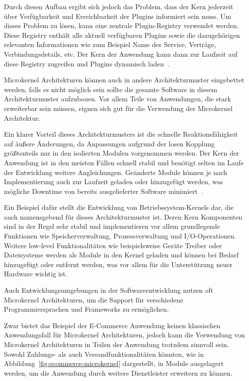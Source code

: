\documentclass[acmtog]{acmart}
\begin{document}
Durch diesen Aufbau ergibt sich jedoch das Problem, dass der Kern jederzeit über Verfügbarkeit und Erreichbarkeit der Plugins informiert sein muss.
Um dieses Problem zu lösen, kann eine zentrale Plugin-Registry verwendet werden.
Diese Registry enthält alle aktuell verfügbaren Plugins sowie die dazugehörigen relevanten Informationen wie zum Beispiel Name des Service, Verträge, Verbindungsdetails, etc.
Der Kern der Anwendung kann dann zur Laufzeit auf diese Registry zugreifen und Plugins dynamisch laden~\cite[22]{architecturePatterns}.

Microkernel Architekturen können auch in andere Architekturmuster eingebettet werden, falls es nicht möglich sein sollte die gesamte Software in diesem Architekturmuster aufzubauen.
Vor allem Teile von Anwendungen, die stark erweiterbar sein müssen, eignen sich gut für die Verwendung der Microkernel Architektur.

Ein klarer Vorteil dieses Architekturmusters ist die schnelle Reaktionsfähigkeit auf äußere Änderungen, da Anpassungen aufgrund der losen Kopplung größtenteils nur in den isolierten Modulen vorgenommen werden.
Der Kern der Anwendung ist in den meisten Fällen schnell stabil und benötigt selten im Laufe der Entwicklung weitere Angleichungen.
Geänderte Module können je nach Implementierung auch zur Laufzeit geladen oder hinzugefügt werden, was mögliche Downtime von bereits ausgelieferter Software minimiert~\cite[25]{architecturePatterns}.

Ein Beispiel dafür stellt die Entwicklung von Betriebssystem-Kernels dar, die auch namensgebend für dieses Architekturmuster ist.
Deren Kern Komponenten sind in der Regel sehr stabil und implementieren vor allem grundlegende Funktionen wie Speicherverwaltung, Prozessverwaltung und I/O-Operationen.
Weitere low-level Funktionalitäten wie beispielsweise Geräte Treiber oder Dateisysteme werden als Module in den Kernel geladen und können bei Bedarf hinzugefügt oder entfernt werden, was vor allem für die Unterstützung neuer Hardware wichtig ist.

Auch Entwicklungsumgebungen in der Softwareentwicklung nutzen oft Microkernel Architekturen, um die Support für verschiedene Programmiersprachen und Frameworks zu ermöglichen.

Zwar bietet das Beispiel der E-Commerce Anwendung keinen klassischen Anwendungsfall für Microkernel Architekturen, jedoch kann die Verwendung von Microkernel Architekturen in Teilen der Anwendung trotzdem sinnvoll sein.
Sowohl Zahlungs- als auch Versandfunktionalitäten könnten, wie in Abbildung~\ref{fig:ecommerce-microkernel} dargestellt, in Module ausgelagert werden, um die Anwendung durch weitere Dienstleister erweitern zu können.
\end{document}
